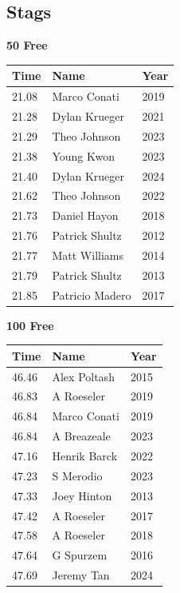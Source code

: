 \subsection{Stags}
\vspace{1.2em}
\noindent\begin{minipage}[t]{0.48\textwidth}
\centering
\textbf{\textcolor{teamprimary}{50 Free}}\par
\vspace{0.5em}
\centering
\small
\renewcommand{\arraystretch}{1.0}
\setlength{\tabcolsep}{4pt}
\begin{tabular}{@{}p{1.8cm}p{3.0cm}p{1.0cm}@{}}
\toprule
\textbf{Time} & \textbf{Name} & \textbf{Year} \\
\midrule
21.08 & Marco Conati & 2019 \\
21.28 & Dylan Krueger & 2021 \\
21.29 & Theo Johnson & 2023 \\
21.38 & Young Kwon & 2023 \\
21.40 & Dylan Krueger & 2024 \\
21.62 & Theo Johnson & 2022 \\
21.73 & Daniel Hayon & 2018 \\
21.76 & Patrick Shultz & 2012 \\
21.77 & Matt Williams & 2014 \\
21.79 & Patrick Shultz & 2013 \\
21.85 & Patricio Madero & 2017 \\
\bottomrule
\end{tabular}
\end{minipage}
\hfill
\begin{minipage}[t]{0.48\textwidth}
\centering
\textbf{\textcolor{teamprimary}{100 Free}}\par
\vspace{0.5em}
\centering
\small
\renewcommand{\arraystretch}{1.0}
\setlength{\tabcolsep}{4pt}
\begin{tabular}{@{}p{1.8cm}p{3.0cm}p{1.0cm}@{}}
\toprule
\textbf{Time} & \textbf{Name} & \textbf{Year} \\
\midrule
46.46 & Alex Poltash & 2015 \\
46.83 & A Roeseler & 2019 \\
46.84 & Marco Conati & 2019 \\
46.84 & A Breazeale & 2023 \\
47.16 & Henrik Barck & 2022 \\
47.23 & S Merodio & 2023 \\
47.33 & Joey Hinton & 2013 \\
47.42 & A Roeseler & 2017 \\
47.58 & A Roeseler & 2018 \\
47.64 & G Spurzem & 2016 \\
47.69 & Jeremy Tan & 2024 \\
\bottomrule
\end{tabular}
\end{minipage}
